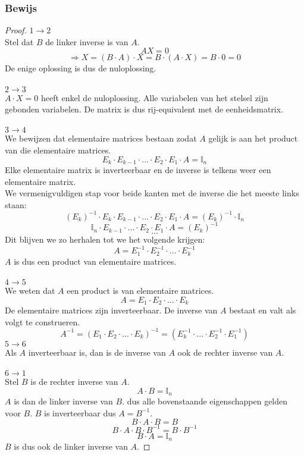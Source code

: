 \documentclass[lineaire_algebra_oplossingen.tex]{subfiles}
\begin{document}
\subsubsection*{Bewijs}
\begin{proof}
\textbf{$1 \rightarrow 2$ }\\
Stel dat $B$ de linker inverse is van $A$.
\[
AX = 0 
\]
\[
\Rightarrow X = (B\cdot A)\cdot X = B \cdot (A\cdot X) = B\cdot 0=0
\]
De enige oplossing is dus de nuloplossing.\\\\
\textbf{$2 \rightarrow 3$ }\\
$A\cdot X = 0$ heeft enkel de nuloplossing. Alle variabelen van het stelsel zijn gebonden variabelen. De matrix is dus rij-equivalent met de eenheidsmatrix.\\\\
\textbf{$3 \rightarrow 4$ }\\
We bewijzen dat elementaire matrices bestaan zodat $A$ gelijk is aan het product van die elementaire matrices.
\[
E_{k}\cdot E_{k-1}\cdot ... \cdot E_{2}\cdot E_{1}\cdot A = \mathbb{I}_{n}
\]
Elke elementaire matrix is inverteerbaar en de inverse is telkens weer een elementaire matrix.\\
We vermenigvuldigen stap voor beide kanten met de inverse die het meeste links staan:
$$(E_{k})^{-1} \cdot E_{k}\cdot E_{k-1}\cdot ... \cdot E_{2}\cdot E_{1}\cdot A = (E_{k})^{-1} \cdot \mathbb{I}_{n}$$
$$\mathbb{I}_n\cdot E_{k-1}\cdot ... \cdot E_{2}\cdot E_{1}\cdot A = (E_{k})^{-1} $$
$$...$$
Dit blijven we zo herhalen tot we het volgende krijgen:
\[
A = E_{1}^{-1}\cdot E_{2}^{-1}\cdot ...\cdot  E_{k}^{-1}
\]
$A$ is dus een product van elementaire matrices.
\\\\
\textbf{$4 \rightarrow 5$ }\\
We weten dat $A$ een product is van elementaire matrices.
\[
A = E_1\cdot E_2 \cdot ... \cdot E_k
\]
De elementaire matrices zijn inverteerbaar. De inverse van $A$ bestaat en valt als volgt te construeren.
\[
A^{-1} = (E_1\cdot E_2 \cdot ... \cdot E_k)^{-1} = (E_k^{-1}\cdot ...\cdot E_2^{-1}\cdot E_1^{-1})
\]
\textbf{$5 \rightarrow 6$ }\\
Als $A$ inverteerbaar is, dan is de inverse van $A$ ook de rechter inverse van $A$.\\\\
\textbf{$6 \rightarrow 1$ }\\
Stel $B$ is de rechter inverse van $A$.
\[
A\cdot B = \mathbb{I}_n
\]
$A$ is dan de linker inverse van $B$. dus alle bovenstaande eigenschappen gelden voor $B$. $B$ is inverteerbaar dus $A = B^{-1}$.
\[
B\cdot A\cdot B = B
\]
\[
B\cdot A \cdot B \cdot B^{-1} = B \cdot B^{-1}
\]
\[
B\cdot A = \mathbb{I}_n
\]
$B$ is dus ook de linker inverse van $A$.
\end{proof}
\end{document}

